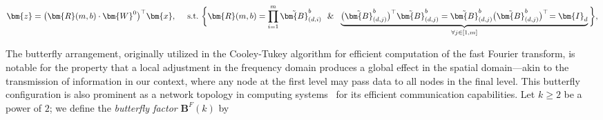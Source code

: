 \begin{equation}
    \begin{aligned}\nonumber
    \bm{z}=\big(\bm{R}(m,b)\cdot\bm{W}^0\big)^\top\bm{x},~~~~\text{s.t.}~\bigg{\{}\bm{R}(m,b)=\prod_{i=1}^m \tilde{\bm{B}}^b_{(d,i)}~~\&~~\underbrace{\big(\tilde{\bm{B}}^b_{(d,j)}\big)^\top\tilde{\bm{B}}^b_{(d,j)}=\tilde{\bm{B}}^b_{(d,j)}\big(\tilde{\bm{B}}^b_{(d,j)}\big)^\top\!=\bm{I}_d}_{\forall j\in [1, m]}\bigg{\}},
    \end{aligned}
\end{equation}

The butterfly arrangement, originally utilized in the Cooley-Tukey algorithm for efficient computation of the fast Fourier transform, is notable for the property that a local adjustment in the frequency domain produces a global effect in the spatial domain—akin to the transmission of information in our context, where any node at the first level may pass data to all nodes in the final level. This butterfly configuration is also prominent as a network topology in computing systems~\cite{solihin2015fundamentals,li2011linear} for its efficient communication capabilities. Let $k\geq 2$ be a power of $2$; we define the \emph{butterfly factor} $\bm{B}^F(k)$ by

